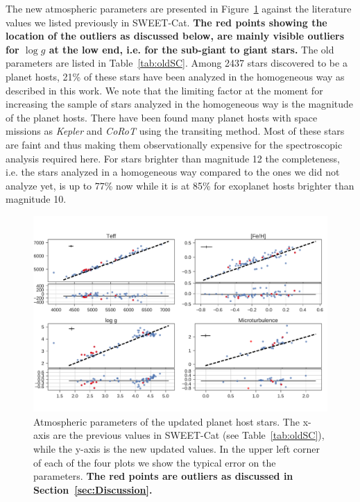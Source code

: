 \documentclass{aa}
\begin{document}
The new atmospheric parameters are presented in Figure~\ref{fig:update} against
the literature values we listed previously in SWEET-Cat. {\bf The red points
showing the location of the outliers as discussed below, are mainly visible
outliers for $\log g$ at the low end, i.e. for the sub-giant to giant stars.}
The old parameters are listed in Table~\ref{tab:oldSC}. Among 2437 stars
discovered to be a planet hosts, 21\% of these stars have been analyzed in the
homogeneous way as described in this work. We note that the limiting factor at
the moment for increasing the sample of stars analyzed in the homogeneous way is
the magnitude of the planet hosts. There have been found many planet hosts with
space missions as \emph{Kepler} and \emph{CoRoT} using the transiting method.
Most of these stars are faint and thus making them observationally expensive for
the spectroscopic analysis required here. For stars brighter than magnitude 12
the completeness, i.e. the stars analyzed in a homogeneous way compared to the
ones we did not analyze yet, is up to 77\% now while it is at 85\% for exoplanet
hosts brighter than magnitude 10.

\begin{figure}[tpb]
    \centering
    \includegraphics[width=1.0\linewidth,natwidth=870,natheight=580]{figures/update.pdf}
    \caption{Atmospheric parameters of the updated planet host stars. The x-axis
    are the previous values in SWEET-Cat (see Table~\ref{tab:oldSC}), while the
    y-axis is the new updated values. In the upper left corner of each of the
    four plots we show the typical error on the parameters. {\bf The red points
    are outliers as discussed in Section~\ref{sec:Discussion}.}}
    \label{fig:update}
\end{figure}
\end{document}
